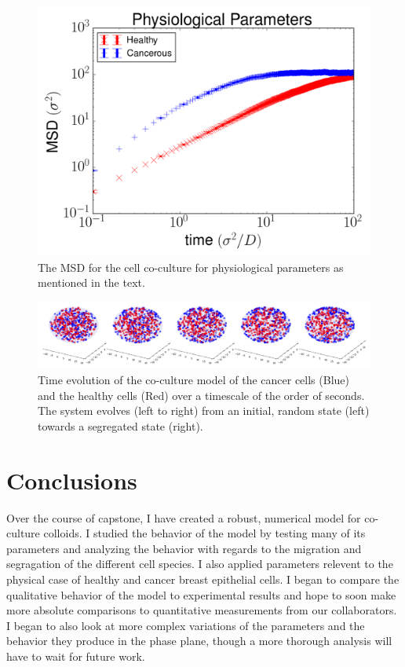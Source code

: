 \documentclass[aps,prb,twocolumn,groupedaddress,nofootinbib,floatfix]{revtex4}
\begin{document}
\begin{figure}
  \includegraphics[width=0.9\columnwidth]{images/physmsd.png}
  \caption{The MSD for the cell co-culture for physiological parameters as mentioned in the text.}
   \label{fig:phys}
\end{figure}

\begin{figure}
  \centering
  \includegraphics[width=\textwidth]{images/separation.png}
  \caption[separation]{Time evolution of the co-culture model of the cancer cells (Blue) and the healthy cells (Red) over a timescale of the order of seconds. The system evolves (left to right) from an initial, random state (left) towards a segregated state (right).}
   \label{fig:separation}
\end{figure}


\section{Conclusions}
Over the course of capstone, I have created a robust, numerical model for co-culture colloids.
I studied the behavior of the model by testing many of its parameters and analyzing the behavior with regards to the migration and segragation of the different cell species.
I also applied parameters relevent to the physical case of healthy and cancer breast epithelial cells.
I began to compare the qualitative behavior of the model to experimental results and hope to soon make more absolute comparisons to quantitative measurements from our collaborators.
I began to also look at more complex variations of the parameters and the behavior they produce in the phase plane, though a more thorough analysis will have to wait for future work.
\end{document}

